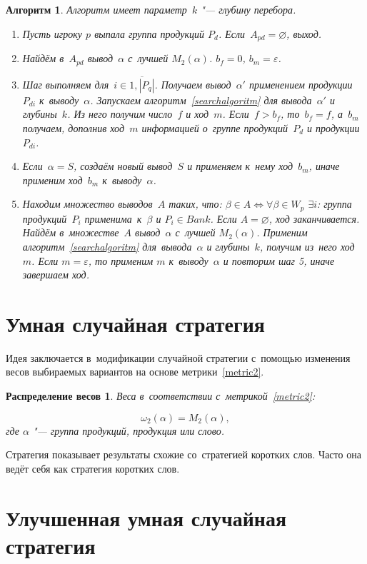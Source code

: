 \documentclass{csmathnotes}
\newtheorem{algoritm}{Алгоритм}
\newtheorem{weight}{Распределение весов}
\begin{document}
\begin{algoritm}
	\label{algoritm4}
	Алгоритм имеет параметр~$k$ "--- глубину перебора. 
	\begin{enumerate}
		\item Пусть игроку $p$ выпала группа продукций $P_d$. Если~$A_{pd} = \varnothing$, выход.
		\item Найдём в~$A_{pd}$ вывод~$\alpha$ с~лучшей $M_2(\alpha)$. $b_f=0$, $b_m = \varepsilon$.
		\item Шаг выполняем для~$i \in \overline{1,|P_q|}$. Получаем вывод~$\alpha'$ применением продукции~$P_{di}$ к~выводу~$\alpha$. Запускаем алгоритм~\ref{searchalgoritm} для вывода~$\alpha'$ и глубины~$k$. Из него получим число~$f$ и ход~$m$. Если~$f>b_f$, то~$b_f=f$, а~$b_m$ получаем, дополнив ход~$m$ информацией о~группе продукций~$P_d$ и продукции~$P_{di}$.
		\item Если~$\alpha = S$, создаём новый вывод~$S$ и применяем к~нему ход~$b_m$, иначе применим ход~$b_m$ к~выводу~$\alpha$. 
		\item Находим множество выводов~$A$ таких, что: $\beta \in A \iff \forall \beta \in W_p$ $\exists i$: группа продукций~$P_i$ применима~к~$\beta$ и $P_i\in Bank$. Если $A = \varnothing$, ход заканчивается. Найдём в~множестве~$A$ вывод~$\alpha$ с~лучшей $M_2(\alpha)$. Применим алгоритм~\ref{searchalgoritm} для~вывода~$\alpha$ и глубины~$k$, получим из~него ход~$m$. Если $m = \varepsilon$, то применим $m$ к~выводу~$\alpha$ и повторим шаг 5, иначе завершаем ход.
	\end{enumerate}
\end{algoritm}

\section*{Умная случайная стратегия}
Идея заключается в~модификации случайной стратегии с~помощью изменения весов выбираемых вариантов на основе метрики~\ref{metric2}.

\begin{weight}
	\label{weight2}
	Веса в~соответствии с~метрикой~\ref{metric2}:
	
	\[\omega_2(\alpha) = M_2(\alpha),\] где $\alpha$ "--- группа продукций, продукция или слово.
\end{weight}

Стратегия показывает результаты схожие со~стратегией коротких слов. Часто она ведёт себя как стратегия коротких слов.


\section*{Улучшенная умная случайная стратегия}
\end{document}

